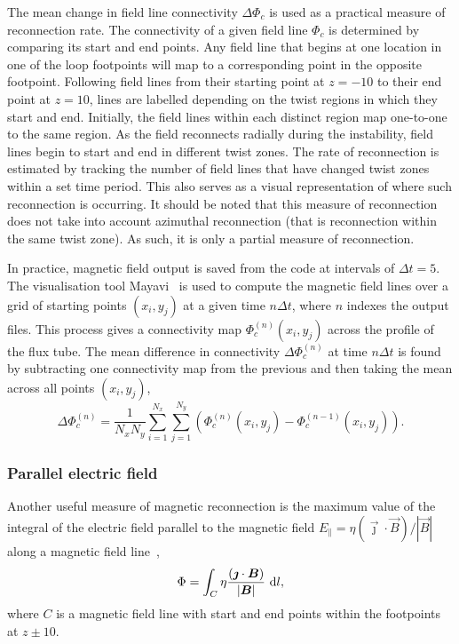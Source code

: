 The mean change in field line connectivity $\Delta\Phi_c$ is used as a practical measure of reconnection rate. The connectivity of a given field line $\Phi_c$ is determined by comparing its start and end points. Any field line that begins at one location in one of the loop footpoints will map to a corresponding point in the opposite footpoint. Following field lines from their starting point at $z=-10$ to their end point at $z=10$, lines are labelled depending on the twist regions in which they start and end. Initially, the field lines within each distinct region map one-to-one to the same region. As the field reconnects radially during the instability, field lines begin to start and end in different twist zones. The rate of reconnection is estimated by tracking the number of field lines that have changed twist zones within a set time period. This also serves as a visual representation of where such reconnection is occurring. It should be noted that this measure of reconnection does not take into account azimuthal reconnection (that is reconnection within the same twist zone). As such, it is only a partial measure of reconnection.

In practice, magnetic field output is saved from the code at intervals of $\Delta t = 5$. The visualisation tool Mayavi~\cite{ramachandran2011mayavi} is used to compute the magnetic field lines over a grid of starting points $(x_i, y_j)$ at a given time $n \Delta t$, where $n$ indexes the output files. This process gives a connectivity map $\Phi_c^{(n)}(x_i, y_j)$ across the profile of the flux tube. The mean difference in connectivity $\Delta \Phi_c^{(n)}$ at time $n\Delta t$ is found by subtracting one connectivity map from the previous and then taking the mean across all points $(x_i, y_j)$,
\begin{equation}
  \Delta \Phi_c^{(n)} = \frac{1}{N_x N_y} \sum_{i=1}^{N_x} \sum_{j=1}^{N_y} (\Phi_c^{(n)}(x_i, y_j) - \Phi_c^{(n-1)}(x_i, y_j)).
\end{equation}

\subsubsection{Parallel electric field}

Another useful measure of magnetic reconnection is the maximum value of the integral of the electric field parallel to the magnetic field $E_{\parallel} = \eta {(\vec{\jmath} \cdot \vec{B})}/|\vec{B}|$ along a magnetic field line~\cite{galsgaardSteadyStateReconnection2011,priestNatureThreedimensionalMagnetic2003,schindlerGeneralMagneticReconnection1988},
\begin{equation}
  \Phi = \int_{C} \eta \frac{(\vec{\jmath} \cdot \vec{B})}{|\vec{B}|}\ {\rm d}l,
\end{equation}
where $C$ is a magnetic field line with start and end points within the footpoints at $z\pm10$.

